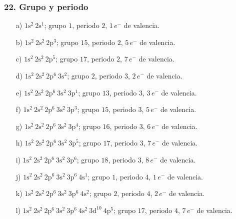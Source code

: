 \subsubsection*{22. Grupo y periodo}
\begin{enumerate}
    \item[a)] $1\mathrm{s}^2\ 2\mathrm{s}^1$;
    grupo $1$, periodo $2$, $1\,e^{-}$ de valencia.

    \item[b)] $1\mathrm{s}^2\ 2\mathrm{s}^2\ 2\mathrm{p}^3$;
    grupo $15$, periodo $2$, $5\,e^{-}$ de valencia.

    \item[c)] $1\mathrm{s}^2\ 2\mathrm{s}^2\ 2\mathrm{p}^5$;
    grupo $17$, periodo $2$, $7\,e^{-}$ de valencia.

    \item[d)] $1\mathrm{s}^2\ 2\mathrm{s}^2\ 2\mathrm{p}^6\ 3\mathrm{s}^2$;
    grupo $2$, periodo $3$, $2\,e^{-}$ de valencia.

    \item[e)] $1\mathrm{s}^2\ 2\mathrm{s}^2\ 2\mathrm{p}^6\
    3\mathrm{s}^2\ 3\mathrm{p}^1$;
    grupo $13$, periodo $3$, $3\,e^{-}$ de valencia.

    \item[f)] $1\mathrm{s}^2\ 2\mathrm{s}^2\ 2\mathrm{p}^6\
    3\mathrm{s}^2\ 3\mathrm{p}^3$;
    grupo $15$, periodo $3$, $5\,e^{-}$ de valencia.

    \item[g)] $1\mathrm{s}^2\ 2\mathrm{s}^2\ 2\mathrm{p}^6\
    3\mathrm{s}^2\ 3\mathrm{p}^4$;
    grupo $16$, periodo $3$, $6\,e^{-}$ de valencia.

    \item[h)] $1\mathrm{s}^2\ 2\mathrm{s}^2\ 2\mathrm{p}^6\
    3\mathrm{s}^2\ 3\mathrm{p}^5$;
    grupo $17$, periodo $3$, $7\,e^{-}$ de valencia.

    \item[i)] $1\mathrm{s}^2\ 2\mathrm{s}^2\ 2\mathrm{p}^6\
    3\mathrm{s}^2\ 3\mathrm{p}^6$;
    grupo $18$, periodo $3$, $8\,e^{-}$ de valencia.

    \item[j)] $1\mathrm{s}^2\ 2\mathrm{s}^2\ 2\mathrm{p}^6\
    3\mathrm{s}^2\ 3\mathrm{p}^6\ 4\mathrm{s}^1$;
    grupo $1$, periodo $4$, $1\,e^{-}$ de valencia.

    \item[k)] $1\mathrm{s}^2\ 2\mathrm{s}^2\ 2\mathrm{p}^6\
    3\mathrm{s}^2\ 3\mathrm{p}^6\ 4\mathrm{s}^2$;
    grupo $2$, periodo $4$, $2\,e^{-}$ de valencia.

    \item[l)] $1\mathrm{s}^2\ 2\mathrm{s}^2\ 2\mathrm{p}^6\
    3\mathrm{s}^2\ 3\mathrm{p}^6\ 4\mathrm{s}^2\
    3\mathrm{d}^{10}\ 4\mathrm{p}^5$;
    grupo $17$, periodo $4$, $7\,e^{-}$ de valencia.
\end{enumerate}

